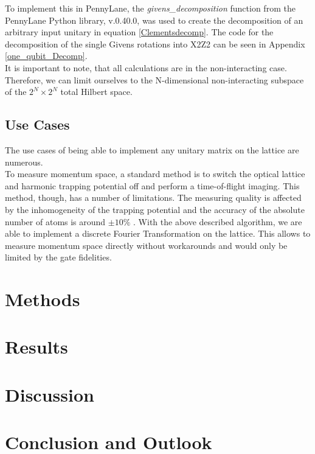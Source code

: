 \documentclass[12pt,twoside]{report}  %
\begin{document}
To implement this in PennyLane, the \textit{givens\_decomposition} function from the PennyLane Python library, v.0.40.0, was used to create the decomposition of an arbitrary input unitary in equation \ref{Clementsdecomp}. The code for the decomposition of the single Givens rotations into X2Z2 can be seen in Appendix \ref{one_qubit_Decomp}. \\
It is important to note, that all calculations are in the non-interacting case. Therefore, we can limit ourselves to the N-dimensional non-interacting subspace of the $2^N \times 2^N$ total Hilbert space.


\section{Use Cases}
The use cases of being able to implement any unitary matrix on the lattice are numerous.\\
To measure momentum space, a standard method is to switch the optical lattice and
harmonic trapping potential off and perform a time-of-flight imaging. This method, though, has a number of limitations. The measuring quality is affected by the inhomogeneity of the trapping potential and the accuracy of the absolute number of atoms is around $\pm 10\%$ \cite{Esslinger_2010}. With the above described algorithm, we are able to implement a discrete Fourier Transformation on the lattice. This allows to measure momentum space directly without workarounds and would only be limited by the gate fidelities.
\newpage

\chapter{Methods}

\chapter{Results}

\chapter{Discussion}

\chapter{Conclusion and Outlook}
\end{document}
